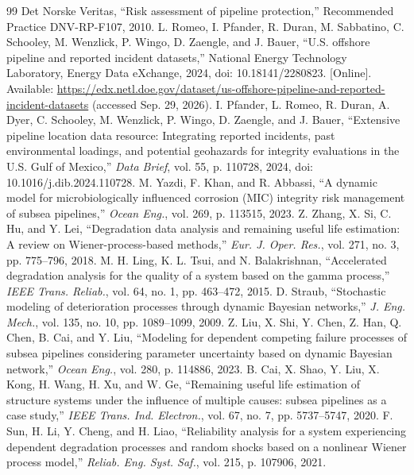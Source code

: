 \documentclass[journal]{IEEEtran}
\begin{document}
\begin{thebibliography}{99}
 Det Norske Veritas, ``Risk assessment of pipeline protection,'' Recommended Practice DNV-RP-F107, 2010.
 L. Romeo, I. Pfander, R. Duran, M. Sabbatino, C. Schooley, M. Wenzlick, P. Wingo, D. Zaengle, and J. Bauer, ``U.S. offshore pipeline and reported incident datasets,'' National Energy Technology Laboratory, Energy Data eXchange, 2024, doi: 10.18141/2280823. [Online]. Available: \url{https://edx.netl.doe.gov/dataset/us-offshore-pipeline-and-reported-incident-datasets} (accessed Sep. 29, 2026).
 I. Pfander, L. Romeo, R. Duran, A. Dyer, C. Schooley, M. Wenzlick, P. Wingo, D. Zaengle, and J. Bauer, ``Extensive pipeline location data resource: Integrating reported incidents, past environmental loadings, and potential geohazards for integrity evaluations in the U.S. Gulf of Mexico,'' \emph{Data Brief}, vol. 55, p. 110728, 2024, doi: 10.1016/j.dib.2024.110728.
 M. Yazdi, F. Khan, and R. Abbassi, ``A dynamic model for microbiologically influenced corrosion (MIC) integrity risk management of subsea pipelines,'' \emph{Ocean Eng.}, vol. 269, p. 113515, 2023.
 Z. Zhang, X. Si, C. Hu, and Y. Lei, ``Degradation data analysis and remaining useful life estimation: A review on Wiener-process-based methods,'' \emph{Eur. J. Oper. Res.}, vol. 271, no. 3, pp. 775--796, 2018.
 M. H. Ling, K. L. Tsui, and N. Balakrishnan, ``Accelerated degradation analysis for the quality of a system based on the gamma process,'' \emph{IEEE Trans. Reliab.}, vol. 64, no. 1, pp. 463--472, 2015.
 D. Straub, ``Stochastic modeling of deterioration processes through dynamic Bayesian networks,'' \emph{J. Eng. Mech.}, vol. 135, no. 10, pp. 1089--1099, 2009.
 Z. Liu, X. Shi, Y. Chen, Z. Han, Q. Chen, B. Cai, and Y. Liu, ``Modeling for dependent competing failure processes of subsea pipelines considering parameter uncertainty based on dynamic Bayesian network,'' \emph{Ocean Eng.}, vol. 280, p. 114886, 2023.
 B. Cai, X. Shao, Y. Liu, X. Kong, H. Wang, H. Xu, and W. Ge, ``Remaining useful life estimation of structure systems under the influence of multiple causes: subsea pipelines as a case study,'' \emph{IEEE Trans. Ind. Electron.}, vol. 67, no. 7, pp. 5737--5747, 2020.
 F. Sun, H. Li, Y. Cheng, and H. Liao, ``Reliability analysis for a system experiencing dependent degradation processes and random shocks based on a nonlinear Wiener process model,'' \emph{Reliab. Eng. Syst. Saf.}, vol. 215, p. 107906, 2021.

\end{thebibliography}
\end{document}

